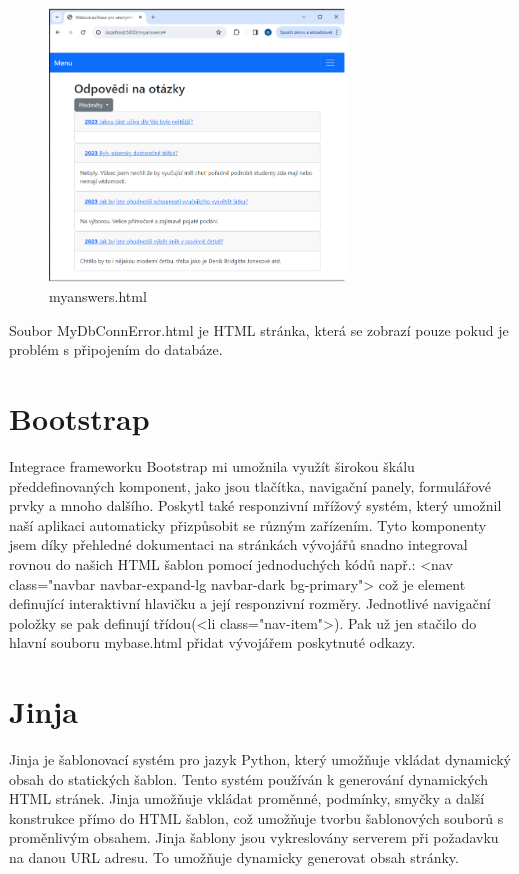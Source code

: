 \documentclass[11pt,a4paper,twoside,openright]{report}
\begin{document}
{\begin{figure}[h]
  \centering
  \includegraphics[width=0.7\textwidth]{myanswers}
  \caption{myanswers.html}
  \label{fig:obrazek}
\end{figure}

Soubor MyDbConnError.html je HTML stránka, která se zobrazí pouze pokud je problém s připojením do databáze.

\section{Bootstrap}

Integrace frameworku Bootstrap mi umožnila využít širokou škálu předdefinovaných komponent, jako jsou tlačítka, navigační panely, formulářové prvky a mnoho dalšího. Poskytl také responzivní mřížový systém, který umožnil naší aplikaci automaticky přizpůsobit se různým zařízením. Tyto komponenty jsem díky přehledné dokumentaci na stránkách vývojářů snadno integroval rovnou do našich HTML šablon pomocí jednoduchých kódů např.: <nav class="navbar navbar-expand-lg navbar-dark bg-primary"> což je element definující interaktivní hlavičku a její responzivní rozměry. Jednotlivé navigační položky se pak definují třídou(<li class="nav-item">). Pak už jen stačilo do hlavní souboru mybase.html přidat vývojářem poskytnuté odkazy.

\section{Jinja}
Jinja je šablonovací systém pro jazyk Python, který umožňuje vkládat dynamický obsah do statických šablon. Tento systém používán k generování dynamických HTML stránek. Jinja umožňuje vkládat proměnné, podmínky, smyčky a další konstrukce přímo do HTML šablon, což umožňuje tvorbu šablonových souborů s proměnlivým obsahem. Jinja šablony jsou vykreslovány serverem při požadavku na danou URL adresu. To umožňuje dynamicky generovat obsah stránky.

}
\end{document}
